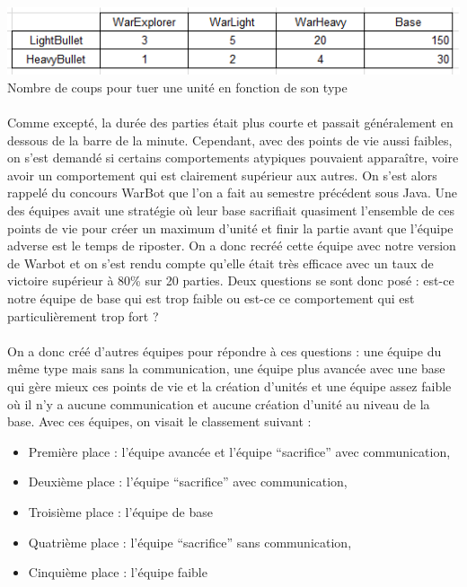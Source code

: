 \documentclass{report}
\begin{document}
\paragraph{}
\begin{adjustwidth}{-3em}{}
\begin{center}
\includegraphics[scale=1]{DATA/coutUnit.png}
 {Nombre de coups pour tuer une unité en fonction de son type}
\end{center}
\end{adjustwidth}
\paragraph{}

\paragraph{}
Comme excepté, la durée des parties était plus courte et passait généralement en dessous de la barre de la minute. Cependant, avec des points de vie aussi faibles, on s’est demandé si certains comportements atypiques pouvaient apparaître, voire avoir un comportement qui est clairement supérieur aux autres.  On s’est alors rappelé du concours WarBot que l’on a fait au semestre précédent sous Java. Une des équipes avait une stratégie où leur base sacrifiait quasiment l’ensemble de ces points de vie pour créer un maximum d’unité et finir la partie avant que l’équipe adverse est le temps de riposter. On a donc recréé cette équipe avec notre version de Warbot et on s’est rendu compte qu’elle était très efficace avec un taux de victoire supérieur à 80\% sur 20 parties. Deux questions se sont donc posé : est-ce notre équipe de base qui est trop faible ou est-ce ce comportement qui est particulièrement trop fort ?
\paragraph{}
On a donc créé d’autres équipes pour répondre à ces questions : une équipe du même type mais sans la communication, une équipe plus avancée avec une base qui gère mieux ces points de vie et la création d’unités et une équipe assez faible où il n’y a aucune communication et aucune création d’unité au niveau de la base. Avec ces équipes, on visait le classement suivant :
\begin{itemize}
\item Première place : l’équipe avancée et l’équipe “sacrifice” avec communication,
\item Deuxième place : l’équipe “sacrifice” avec communication,
\item Troisième place  : l’équipe de base 
\item Quatrième place : l’équipe “sacrifice” sans communication,
\item Cinquième place : l’équipe faible
\end{itemize}
\end{document}
